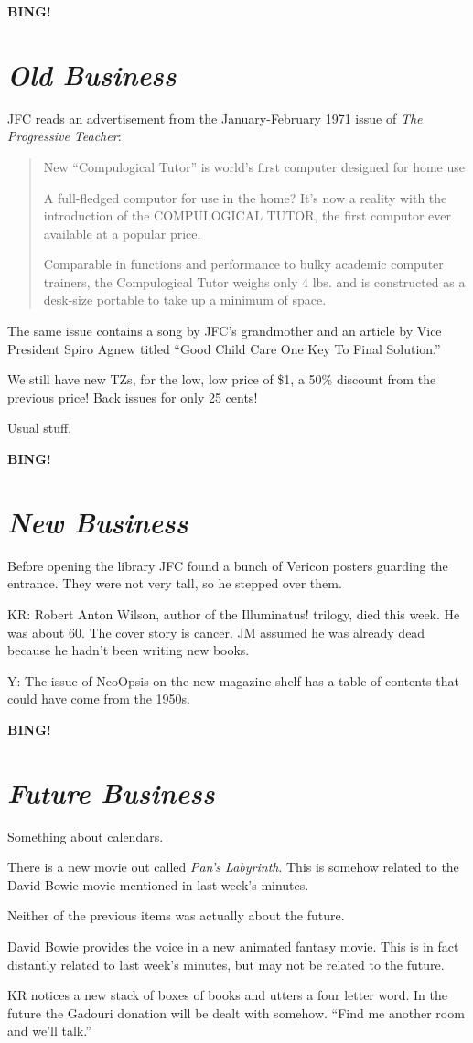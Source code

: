 \documentclass[10pt]{article}
\newcommand{\bing}{{\bf BING!} }
\newcommand{\goto}[1]{\bing \vskip 12pt \section*{{\em{#1}}}}
\begin{document}
\goto{Old Business}

JFC reads an advertisement from the January-February 1971
issue of {\em The Progressive Teacher}:
\begin{quotation}
New ``Compulogical Tutor'' is world's first computer designed for home use

A full-fledged computor for use in the home? It's now a reality with
the introduction of the COMPULOGICAL TUTOR, the first computor ever
available at a popular price.

Comparable in functions and performance to bulky academic computer
trainers, the Compulogical Tutor weighs only 4 lbs. and is constructed
as a desk-size portable to take up a minimum of space.
\end{quotation}

The same issue contains a song by JFC's grandmother and an
article by Vice President Spiro Agnew titled ``Good Child
Care One Key To Final Solution.''

We still have new TZs, for the low, low price of \$1, a 50\%
discount from the previous price!  Back issues for only 25
cents!

Usual stuff.

\goto{New Business}

Before opening the library JFC found a bunch of Vericon posters
guarding the entrance.  They were not very tall, so he stepped
over them.

KR:
Robert Anton Wilson, author of the Illuminatus! trilogy, died this week.
He was about 60.  The cover story is cancer.
JM assumed he was already dead because he hadn't been writing new books.

Y: The issue of NeoOpsis on the new magazine shelf has a table of
contents that could have come from the 1950s.

\goto{Future Business}

Something about calendars.

There is a new movie out called {\em Pan's Labyrinth}.  This is
somehow related to the David Bowie movie mentioned in last week's
minutes.

Neither of the previous items was actually about the future.

David Bowie provides the voice in a new animated fantasy movie.
This is in fact distantly related to last week's minutes, but
may not be related to the future.

KR notices a new stack of boxes of books and utters a four letter word.
In the future the Gadouri donation will be dealt with somehow.
``Find me another room and we'll talk.''
\end{document}
